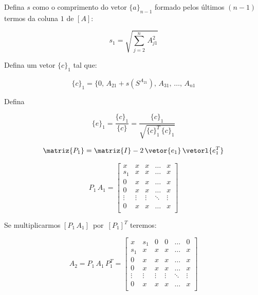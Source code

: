 \begin{enumerar}

\item Defina $ s $ como o comprimento do vetor $ \{a\}_{n-1} $ formado pelos últimos $ (n-1) $ termos da coluna $ 1 $ de $ [A] $:

\begin{equation}
 s_1 = \sqrt{\sum_{j=2}^n \, A_{j1}^2}
\end{equation}

\item Defina um vetor $ \{c\}_1 $ tal que:

\begin{equation}
 \{c\}_1 = \{0, \, A_{21} + s(S^{A_21}), \, A_{31}, \, \ldots, \, A_{n1}
\end{equation}

\item Defina

\begin{equation}
 \{e\}_1 = \frac{\{c\}_1}{\{c\}} = \frac{\{c\}_1}{\sqrt{\{c\}_1^T \, \{c\}_1}}
\end{equation}

\item 

\begin{equation}
 \matriz{P_1} = \matriz{I} - 2 \, \vetor{e_1} \, \vetorl{e_1^T}
\end{equation}

\begin{equation}
 P_1 \, A_1 =
 \left[
 \begin{array}{ccccc}
  x & x & x & \ldots & x \\
  s_1 & x & x & \ldots & x \\
  0 & x & x & \ldots & x \\
  0 & x & x & \ldots & x \\
  \vdots & \vdots & \vdots & \ddots & \vdots \\
  0 & x & x & \ldots & x \\
 \end{array}
 \right]
\end{equation}

Se multiplicarmos $ [P_1 \, A_1] \, $ por $ \, [P_1]^T $ teremos:

\begin{equation}
 A_2 = P_1 \, A_1 \, P_1^T =
 \left[
 \begin{array}{cccccc}
  x & s_1 & 0 & 0 & \ldots & 0 \\
  s_1 & x & x & x & \ldots & x \\
  0 & x & x & x & \ldots & x \\
  0 & x & x & x & \ldots & x \\
  \vdots & \vdots & \vdots & \vdots & \ddots & \vdots \\
  0 & x & x & x & \ldots & x \\
 \end{array}
 \right]
\end{equation}

\end{enumerar}

